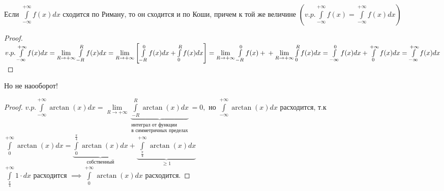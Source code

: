 \documentclass[../main.tex]{subfiles}
\begin{document}
\begin{theorem}
Если $\int\limits_{-\infty  }^{+\infty  } f(x)dx$ сходится по Риману, то он сходится и по Коши, причем к той же величине $\left(v.p. \int\limits_{-\infty   }^{+\infty}f(x)=\int\limits_{-\infty    }^{+\infty  } f(x)dx \right)$ 
\end{theorem}
\begin{proof}
$v.p. \int\limits_{-\infty  }^{+\infty}f(x)dx=\lim\limits_{R\to +\infty}\int\limits_{-R}^{R}f(x)dx=\lim\limits_{R\to +\infty}\left[\int\limits_{-R}^{0}f(x)dx +\int\limits_{0}^{R}f(x)dx\right]=\lim\limits_{R\to +\infty}\int\limits_{-R}^{0}f(x)+\\+\lim\limits_{R\to +\infty   } \int\limits_{0}^{R}f(x)dx= \int\limits_{-\infty    }^{0} f(x)dx+\int\limits_{0}^{+\infty   } f(x)dx= \int\limits_{-\infty  }^{+\infty  } f(x)dx  $
\end{proof}
Но не наооборот! 
\begin{proof}
$v.p. \int\limits_{-\infty  }^{+\infty  } \arctan{(x)}dx=\lim\limits_{R\to +\infty}\underbrace{\int\limits_{-R}^{R}\arctan{(x)}dx}_{\substack{\text{интеграл от функции}\\ \text{в симметричных пределах}}}  =0, \text{ но } \int\limits_{-\infty  }^{+\infty  } \arctan{(x)}dx$ расходится, т.к $\int\limits_{0}^{+\infty}\arctan{(x)}dx = \underbrace{\int\limits_{0}^{\frac{\pi}{4}}\arctan{(x)}dx}_{\text{собственный}} +\underbrace{\int\limits_{\frac{\pi}{4}}^{+\infty}\arctan{(x)}dx}_{\geqslant 1} $
\\ $\int\limits_{\frac{\pi}{4}}^{+\infty}1\cdot dx  $ расходится $\implies \int\limits_{0}^{+\infty}\arctan{(x)}dx $ расходится.
\end{proof}
\end{document}
